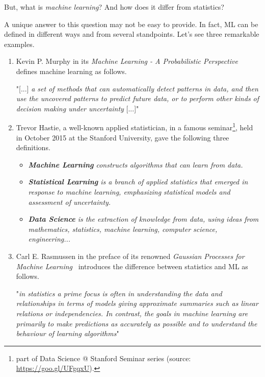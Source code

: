 But, what is \textit{machine learning}? And how does it differ from statistics?

A unique answer to this question may not be easy to provide. In fact, ML can be defined in different ways and from several standpoints. Let's see three remarkable examples.

\begin{enumerate}
  \item Kevin P. Murphy in its \emph{Machine Learning - A Probabilistic Perspective}~\cite{murphy2012machine} defines machine learning as follows.

  \begin{displayquote}
  "[...] \emph{a set of methods that can automatically detect patterns in data, and then use the uncovered patterns to predict future data, or to perform other kinds of decision making under uncertainty} [...]"
  \end{displayquote}

  \item Trevor Hastie, a well-known applied statistician, in a famous seminar\footnote{part of Data Science @ Stanford Seminar series (source: \url{https://goo.gl/UFgqxU}).}, held in October 2015 at the Stanford University, gave the following three definitions.

  \begin{displayquote}
    \begin{itemize}
      \item[] \emph{{\bf Machine Learning} constructs algorithms that can learn from data.}
      \item[] \emph{{\bf Statistical Learning}  is a branch of applied statistics that emerged in response to machine learning, emphasizing statistical models and assessment of uncertainty.}
      \item[] \emph{{\bf Data Science}  is the extraction of knowledge from data, using ideas from mathematics, statistics, machine learning, computer science, engineering...}
    \end{itemize}
  \end{displayquote}

  \item Carl E. Rasmussen in the preface of its renowned \emph{Gaussian Processes for Machine Learning}~\cite{rasmussen2006gaussian} introduces the difference between statistics and ML as follows.

  \begin{displayquote}
    "\emph{in statistics a prime focus is often in understanding the data and relationships in terms of models giving approximate summaries such as linear relations or independencies. In contrast, the goals in machine learning are primarily to make predictions as accurately as possible and to understand the behaviour of learning algorithms}"
  \end{displayquote}

\end{enumerate}

